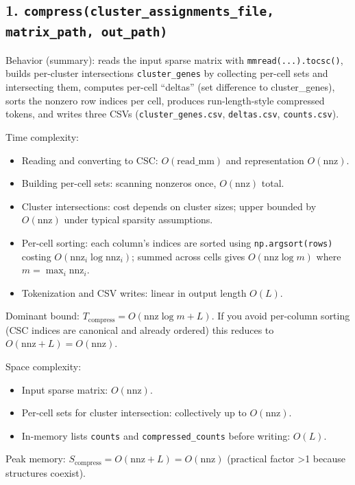 \documentclass[11pt]{article}
\begin{document}
\subsection*{1. \texttt{compress(cluster\_assignments\_file, matrix\_path, out\_path)}}
Behavior (summary): reads the input sparse matrix with \texttt{mmread(...).tocsc()}, builds per-cluster
intersections \texttt{cluster\_genes} by collecting per-cell sets and intersecting them, computes per-cell
``deltas'' (set difference to cluster_genes), sorts the nonzero row indices per cell, produces run-length-style
compressed tokens, and writes three CSVs (\texttt{cluster\_genes.csv}, \texttt{deltas.csv}, \texttt{counts.csv}).

Time complexity:
\begin{itemize}
	\item Reading and converting to CSC: $O(\mathrm{read\_mm})$ and representation $O(\mathrm{nnz})$.
	\item Building per-cell sets: scanning nonzeros once, $O(\mathrm{nnz})$ total.
	\item Cluster intersections: cost depends on cluster sizes; upper bounded by $O(\mathrm{nnz})$ under typical sparsity assumptions.
	\item Per-cell sorting: each column's indices are sorted using \texttt{np.argsort(rows)} costing $O(\mathrm{nnz}_i \log \mathrm{nnz}_i)$;
		summed across cells gives $O(\mathrm{nnz} \log m)$ where $m=\max_i \mathrm{nnz}_i$.
	\item Tokenization and CSV writes: linear in output length $O(L)$.
\end{itemize}
Dominant bound: $T_{\text{compress}} = O(\mathrm{nnz}\log m + L)$. If you avoid per-column sorting (CSC indices are canonical
and already ordered) this reduces to $O(\mathrm{nnz}+L)=O(\mathrm{nnz})$.

Space complexity:
\begin{itemize}
	\item Input sparse matrix: $O(\mathrm{nnz})$.
	\item Per-cell sets for cluster intersection: collectively up to $O(\mathrm{nnz})$.
	\item In-memory lists \texttt{counts} and \texttt{compressed\_counts} before writing: $O(L)$.
\end{itemize}
Peak memory: $S_{\text{compress}}=O(\mathrm{nnz}+L)=O(\mathrm{nnz})$ (practical factor >1 because structures coexist).
\end{document}
